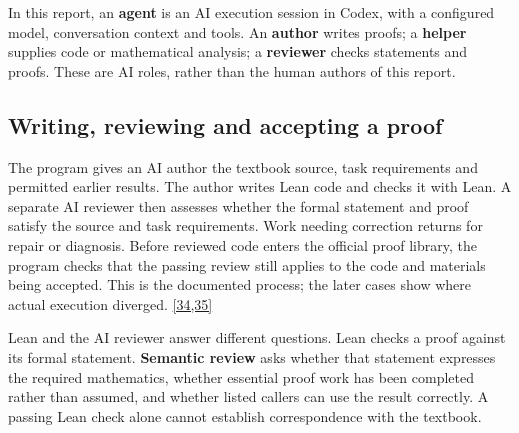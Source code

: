 In this report, an \textbf{agent} is an AI execution session in Codex, with a configured model, conversation context and tools. An \textbf{author} writes proofs; a \textbf{helper} supplies code or mathematical analysis; a \textbf{reviewer} checks statements and proofs. These are AI roles, rather than the human authors of this report.

\subsection[Writing, reviewing and accepting a proof]{\texorpdfstring{\protect\hypertarget{section-1-2}{}Writing, reviewing and accepting a proof}{Writing, reviewing and accepting a proof}}
The program gives an AI author the textbook source, task requirements and permitted earlier results. The author writes Lean code and checks it with Lean. A separate AI reviewer then assesses whether the formal statement and proof satisfy the source and task requirements. Work needing correction returns for repair or diagnosis. Before reviewed code enters the official proof library, the program checks that the passing review still applies to the code and materials being accepted. This is the documented process; the later cases show where actual execution diverged. \hyperlink{ref-34}{\mbox{[34,35]}}

Lean and the AI reviewer answer different questions. Lean checks a proof against its formal statement. \textbf{Semantic review} asks whether that statement expresses the required mathematics, whether essential proof work has been completed rather than assumed, and whether listed callers can use the result correctly. A passing Lean check alone cannot establish correspondence with the textbook.

